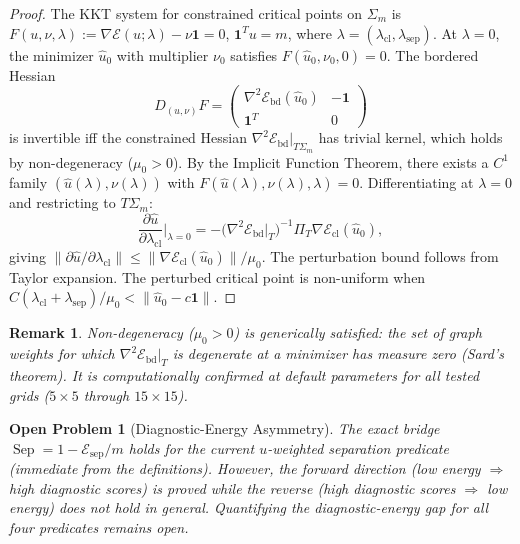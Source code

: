 \documentclass[lettersize,journal]{IEEEtran}
\newtheorem{remark}{Remark}
\newtheorem{openproblem}{Open Problem}
\DeclareMathOperator{\Sep}{Sep}
\begin{document}
\begin{proof}
The KKT system for constrained critical points on $\Sigma_m$ is $F(u, \nu, \lambda) := \nabla\mathcal{E}(u;\lambda) - \nu\mathbf{1} = 0$, $\mathbf{1}^T u = m$, where $\lambda = (\lambda_{\mathrm{cl}}, \lambda_{\mathrm{sep}})$. At $\lambda = 0$, the minimizer $\hat{u}_0$ with multiplier $\nu_0$ satisfies $F(\hat{u}_0, \nu_0, 0) = 0$. The bordered Hessian
\[
D_{(u,\nu)}F = \begin{pmatrix} \nabla^2\mathcal{E}_{\mathrm{bd}}(\hat{u}_0) & -\mathbf{1} \\ \mathbf{1}^T & 0 \end{pmatrix}
\]
is invertible iff the constrained Hessian $\nabla^2\mathcal{E}_{\mathrm{bd}}|_{T\Sigma_m}$ has trivial kernel, which holds by non-degeneracy ($\mu_0 > 0$). By the Implicit Function Theorem, there exists a $C^1$ family $(\hat{u}(\lambda), \nu(\lambda))$ with $F(\hat{u}(\lambda), \nu(\lambda), \lambda) = 0$. Differentiating at $\lambda = 0$ and restricting to $T\Sigma_m$:
\[
\frac{\partial \hat{u}}{\partial \lambda_{\mathrm{cl}}}\bigg|_{\lambda=0} = -\bigl(\nabla^2\mathcal{E}_{\mathrm{bd}}\big|_T\bigr)^{-1} \Pi_T \nabla\mathcal{E}_{\mathrm{cl}}(\hat{u}_0),
\]
giving $\|\partial\hat{u}/\partial\lambda_{\mathrm{cl}}\| \leq \|\nabla\mathcal{E}_{\mathrm{cl}}(\hat{u}_0)\|/\mu_0$. The perturbation bound follows from Taylor expansion. The perturbed critical point is non-uniform when $C(\lambda_{\mathrm{cl}} + \lambda_{\mathrm{sep}})/\mu_0 < \|\hat{u}_0 - c\mathbf{1}\|$.
\end{proof}

\begin{remark}
Non-degeneracy ($\mu_0 > 0$) is generically satisfied: the set of graph weights for which $\nabla^2\mathcal{E}_{\mathrm{bd}}|_T$ is degenerate at a minimizer has measure zero (Sard's theorem). It is computationally confirmed at default parameters for all tested grids ($5 \times 5$ through $15 \times 15$).
\end{remark}

\begin{openproblem}[Diagnostic-Energy Asymmetry]
The exact bridge $\Sep = 1 - \mathcal{E}_{\mathrm{sep}}/m$ holds for the current $u$-weighted separation predicate (immediate from the definitions). However, the forward direction (low energy $\Rightarrow$ high diagnostic scores) is proved while the reverse (high diagnostic scores $\Rightarrow$ low energy) does not hold in general. Quantifying the diagnostic-energy gap for all four predicates remains open.
\end{openproblem}
\end{document}
